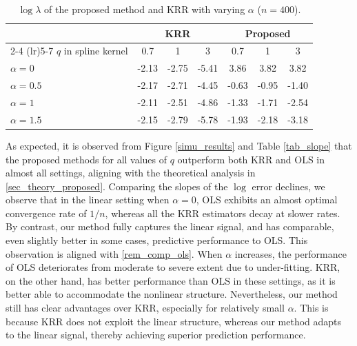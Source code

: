 \documentclass[11pt,twoside]{article}
\begin{document}
\begin{table}
\centering
\caption{$\log \lambda$ of the proposed method and KRR with varying $\alpha$ ($n=400$).}
\label{tab_lambda}
\small
\setlength{\tabcolsep}{7pt}
\begin{tabular}{lcccccc}
\toprule
& \multicolumn{3}{c}{KRR} & \multicolumn{3}{c}{Proposed} \\
\cmidrule(lr){2-4} \cmidrule(lr){5-7}
$q$ in spline kernel & 0.7 & 1 & 3 & 0.7 & 1 & 3 \\
\midrule
$\alpha = 0$   & -2.13 & -2.75 & -5.41 & 3.86 & 3.82 & 3.82 \\
$\alpha = 0.5$ & -2.17 & -2.71 & -4.45 & -0.63 & -0.95 & -1.40 \\
$\alpha = 1$   & -2.11 & -2.51 & -4.86 & -1.33 & -1.71 & -2.54 \\
$\alpha = 1.5$ & -2.15 & -2.79 & -5.78 & -1.93 & -2.18 & -3.18 \\
\bottomrule
\end{tabular}
\end{table}

 As expected, it is observed from Figure \ref{simu_results} and Table 
\ref{tab_slope} that the proposed methods for all values of $q$ outperform both KRR and OLS in almost all settings, aligning with the theoretical analysis in \cref{sec_theory_proposed}.
Comparing the slopes of the $\log$ error declines,
we observe that in the linear setting when $\alpha =0$,  OLS exhibits an almost optimal convergence rate of  $1/n$, whereas all the KRR estimators decay at slower rates. By contrast, our method fully captures the linear signal, and has 
comparable, even slightly better in some cases, predictive performance to OLS.  This observation is aligned with  \cref{rem_comp_ols}.
When $\alpha$  increases, the performance of OLS deteriorates from moderate to severe extent due to under-fitting. KRR, on the other hand, has better performance than OLS in these settings, as it is better able to accommodate the nonlinear structure. Nevertheless, our method still has clear advantages over KRR, especially for relatively small $\alpha$. This is because KRR does not exploit the linear structure, whereas our method adapts to the linear signal, thereby achieving superior prediction performance. 
\end{document}
